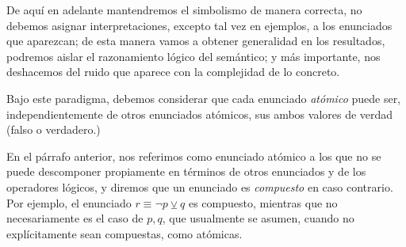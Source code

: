 \documentclass{book}
\theoremstyle{definition}
\begin{document}
De aquí en adelante mantendremos el simbolismo de manera correcta, no debemos asignar interpretaciones, excepto tal vez en ejemplos, a los enunciados que aparezcan; de esta manera vamos a obtener generalidad en los resultados, podremos aislar el razonamiento lógico del semántico; y más importante, nos deshacemos del ruido que aparece con la complejidad de lo concreto.

Bajo este paradigma, debemos considerar que cada enunciado \emph{atómico} puede ser, independientemente de otros enunciados atómicos, sus ambos valores de verdad (falso o verdadero.)

En el párrafo anterior, nos referimos como enunciado atómico a los que no se puede descomponer propiamente en términos de otros enunciados y de los operadores lógicos, y diremos que un enunciado es \emph{compuesto} en caso contrario.
Por ejemplo, el enunciado $r \equiv \neg p \veebar q$ es compuesto, mientras que no necesariamente es el caso de $p,q$, que usualmente se asumen, cuando no explícitamente sean compuestas, como atómicas.
\end{document}
